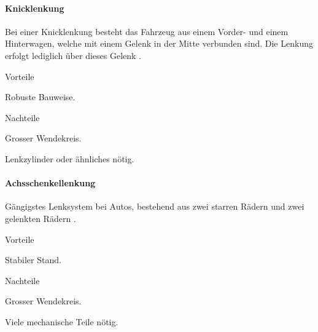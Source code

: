 \documentclass[../main.tex]{subfiles}
\begin{document}
\paragraph{Knicklenkung} \label{recherche-knicklenkung}

Bei einer Knicklenkung besteht das Fahrzeug aus einem Vorder- und einem Hinterwagen, welche mit einem Gelenk in der Mitte verbunden sind. Die Lenkung erfolgt lediglich über dieses Gelenk \cite{knicklenkung}.

\begin{minipage}[t]{0.48\textwidth}
    \begin{items}
      \item [Vorteile]
      \item Robuste Bauweise.
 \end{items}
\end{minipage}
\hfill
\begin{minipage}[t]{0.48\textwidth}
    \begin{items}
      \item [Nachteile]
      \item Grosser Wendekreis.
      \item Lenkzylinder oder ähnliches nötig.
    \end{items}
\end{minipage}

\paragraph{Achsschenkellenkung} \label{recherche-achsschenkellenkung}

Gängigstes Lenksystem bei Autos, bestehend aus zwei starren Rädern und zwei gelenkten Rädern \cite{achsschenkel}.

\begin{minipage}[t]{0.48\textwidth}
    \begin{items}
      \item [Vorteile]
      \item Stabiler Stand.
 \end{items}
\end{minipage}
\hfill
\begin{minipage}[t]{0.48\textwidth}
    \begin{items}
      \item [Nachteile]
      \item Grosser Wendekreis.
      \item Viele mechanische Teile nötig.
    \end{items}
\end{minipage}
\end{document}
